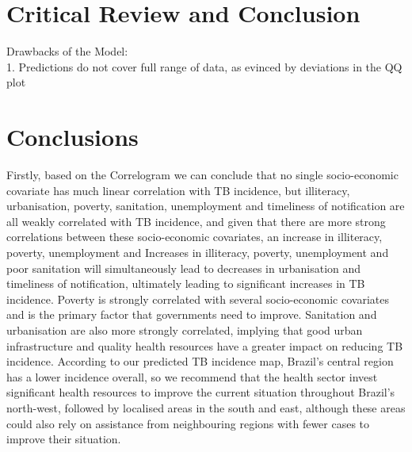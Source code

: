 \section{Critical Review and Conclusion}
Drawbacks of the Model:
\\
1. Predictions do not cover full range of data, as evinced by deviations in the QQ plot
\\

\section{Conclusions}
Firstly, based on the Correlogram we can conclude that no single socio-economic covariate has much linear correlation with TB incidence, but illiteracy, urbanisation, poverty, sanitation, unemployment and timeliness of notification are all weakly correlated with TB incidence, and given that there are more strong correlations between these socio-economic covariates, an increase in illiteracy, poverty, unemployment and Increases in illiteracy, poverty, unemployment and poor sanitation will simultaneously lead to decreases in urbanisation and timeliness of notification, ultimately leading to significant increases in TB incidence. Poverty is strongly correlated with several socio-economic covariates and is the primary factor that governments need to improve. Sanitation and urbanisation are also more strongly correlated, implying that good urban infrastructure and quality health resources have a greater impact on reducing TB incidence. According to our predicted TB incidence map, Brazil's central region has a lower incidence overall, so we recommend that the health sector invest significant health resources to improve the current situation throughout Brazil's north-west, followed by localised areas in the south and east, although these areas could also rely on assistance from neighbouring regions with fewer cases to improve their situation.